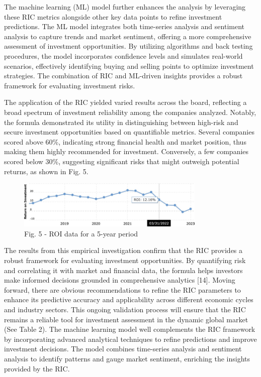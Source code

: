 \begin{multicols}{2}
The machine learning (ML) model further enhances the analysis by
leveraging these RIC metrics alongside other key data points to refine
investment predictions. The ML model integrates both time-series
analysis and sentiment analysis to capture trends and market sentiment,
offering a more comprehensive assessment of investment opportunities. By
utilizing algorithms and back testing procedures, the model incorporates
confidence levels and simulates real-world scenarios, effectively
identifying buying and selling points to optimize investment strategies.
The combination of RIC and ML-driven insights provides a robust
framework for evaluating investment risks.

The application of the RIC yielded varied results across the board,
reflecting a broad spectrum of investment reliability among the
companies analyzed. Notably, the formula demonstrated its utility in
distinguishing between high-risk and secure investment opportunities
based on quantifiable metrics. Several companies scored above 60\%,
indicating strong financial health and market position, thus making them
highly recommended for investment. Conversely, a few companies scored
below 30\%, suggesting significant risks that might outweigh potential
returns, as shown in Fig. 5.
\end{multicols}

\begin{figure}[H]
	\centering
	\includegraphics[width=0.8\textwidth]{media/ict2/image13}
	\caption*{Fig. 5 - ROI data for a 5-year period}
\end{figure}

\begin{multicols}{2}
The results from this empirical investigation confirm that the RIC
provides a robust framework for evaluating investment opportunities. By
quantifying risk and correlating it with market and financial data, the
formula helps investors make informed decisions grounded in
comprehensive analytics {[}14{]}. Moving forward, there are obvious
recommendations to refine the RIC parameters to enhance its predictive
accuracy and applicability across different economic cycles and industry
sectors. This ongoing validation process will ensure that the RIC
remains a reliable tool for investment assessment in the dynamic global
market (See Table 2). The machine learning model well complements the
RIC framework by incorporating advanced analytical techniques to refine
predictions and improve investment decisions. The model combines
time-series analysis and sentiment analysis to identify patterns and
gauge market sentiment, enriching the insights provided by the RIC.
\end{multicols}

